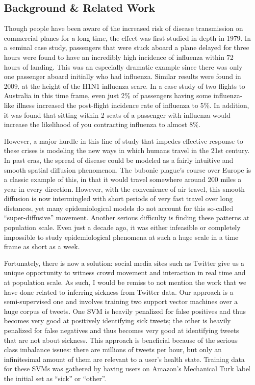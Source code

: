 \documentclass[11pt, letterpaper]{article}
\begin{document}
        \subsection{Background \& Related Work}
            Though people have been aware of the increased risk of disease transmission on commercial planes for a long time, the effect was first studied in depth in 1979. In a seminal case study, passengers that were stuck aboard a plane delayed for three hours were found to have an incredibly high incidence of influenza within 72 hours of landing. This was an especially dramatic example since there was only one passenger aboard initially who had influenza. \cite{moser} Similar results were found in 2009, at the height of the H1N1 influenza scare. In a case study of two flights to Australia in this time frame, even just 2\% of passengers having some influenza-like illness increased the post-flight incidence rate of influenza to 5\%. In addition, it was found that sitting within 2 seats of a passenger with influenza would increase the likelihood of you contracting influenza to almost 8\%. \cite{foxwell}

            However, a major hurdle in this line of study that impedes effective response to these crises is modeling the new ways in which humans travel in the 21st century. In past eras, the spread of disease could be modeled as a fairly intuitive and smooth spatial diffusion phenomenon. The bubonic plague's course over Europe is a classic example of this, in that it would travel somewhere around 200 miles a year in every direction. \cite{colizza} However, with the convenience of air travel, this smooth diffusion is now intermingled with short periods of very fast travel over long distances, yet many epidemiological models do not account for this so-called ``super-diffusive'' movement. \cite{brockmann} Another serious difficulty is finding these patterns at population scale. Even just a decade ago, it was either infeasible or completely impossible to study epidemiological phenomena at such a huge scale in a time frame as short as a week.

            Fortunately, there is now a solution: social media sites such as Twitter give us a unique opportunity to witness crowd movement and interaction in real time and at population scale. As such, I would be remiss to not mention the work that we have done related to inferring sickness from Twitter data. Our approach is a semi-supervised one and involves training two support vector machines over a huge corpus of tweets. One SVM is heavily penalized for false positives and thus becomes very good at positively identifying sick tweets; the other is heavily penalized for false negatives and thus becomes very good at identifying tweets that are not about sickness. This approach is beneficial because of the serious class imbalance issues: there are millions of tweets per hour, but only an infinitesimal amount of them are relevant to a user's health state. Training data for these SVMs was gathered by having users on Amazon's Mechanical Turk label the initial set as ``sick'' or ``other''. \cite{sadilek}
\end{document}
